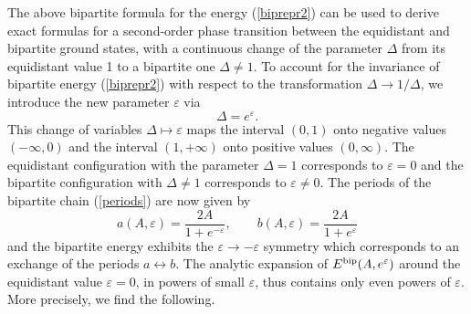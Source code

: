 \documentclass[12pt]{iopart}
\theoremstyle{definition}
\begin{document}
The above bipartite formula for the energy (\ref{biprepr2}) can be used
to derive exact formulas for a second-order phase transition between
the equidistant and bipartite ground states, with a continuous change of
the parameter $\Delta$ from its equidistant value 1 to
a bipartite one $\Delta\ne 1$.
To account for the invariance of bipartite energy (\ref{biprepr2})
with respect to the transformation $\Delta\to 1/\Delta$, we introduce
the new parameter $\varepsilon$ via
\begin{equation}
\Delta = e^{\varepsilon} .
\end{equation}
This change of variables $\Delta\mapsto \varepsilon$ maps the interval $(0,1)$ onto negative values $(-\infty,0)$ and the interval $(1,+\infty)$ onto positive values $(0,\infty)$.
The equidistant configuration with the parameter $\Delta=1$ corresponds to $\varepsilon=0$
and the bipartite configuration with $\Delta\ne 1$ corresponds to
$\varepsilon\ne 0$.
The periods of the bipartite chain (\ref{periods}) are now given by
\begin{equation} \label{periodseps}
a(A,\varepsilon) = \frac{2A}{1+e^{-\varepsilon}} ,
\qquad b(A,\varepsilon) = \frac{2A}{1+e^{\varepsilon}}   
\end{equation}
and the bipartite energy exhibits the $\varepsilon\to -\varepsilon$ symmetry
which corresponds to an exchange of the periods $a\leftrightarrow b$.
The analytic expansion of $E^{\rm bip}(A,e^{\varepsilon})$ around the equidistant
value $\varepsilon=0$, in powers of small $\varepsilon$, thus contains
only even powers of $\varepsilon$. More precisely, we find the following.
\end{document}
